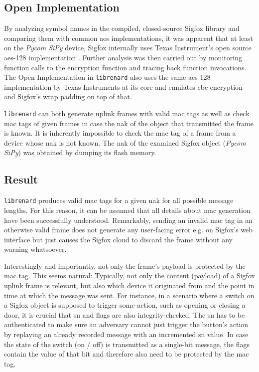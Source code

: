 \subsection{Open Implementation}
\label{sec:uplink_mac_reimp}
By analyzing symbol names in the compiled, closed-source Sigfox library and comparing them with common \gls{aes} implementations, it was apparent that at least on the \textit{Pycom SiPy} device, Sigfox internally uses Texas Instrument's open source \gls{aes}-128 implementation \cite{tiaes}.
Further analysis was then carried out by monitoring function calls to the encryption function and tracing back function invocations.
The Open Implementation in \texttt{librenard} also uses the same \gls{aes}-128 implementation by Texas Instruments at its core and emulates \gls{cbc} encryption and Sigfox's wrap padding on top of that.

\texttt{librenard} can both generate uplink frames with valid \gls{mac} tags as well as check \gls{mac} tags of given frames in case the \gls{nak} of the object that transmitted the frame is known.
It is inherently impossible to check the \gls{mac} tag of a frame from a device whose \gls{nak} is not known.
The \gls{nak} of the examined Sigfox object (\textit{Pycom SiPy}) was obtained by dumping its flash memory.

\subsection{Result}
\label{sec:uplink_mac_result}
\texttt{librenard} produces valid \gls{mac} tags for a given \gls{nak} for all possible message lengths.
For this reason, it can be assumed that all details about \gls{mac} generation have been successfully understood.
Remarkably, sending an invalid \gls{mac} tag in an otherwise valid frame does not generate any user-facing error e.g. on Sigfox's web interface but just causes the Sigfox cloud to discard the frame without any warning whatsoever.

Interestingly and importantly, not only the frame's payload is protected by the \gls{mac} tag.
This seems natural: Typically, not only the content (payload) of a Sigfox uplink frame is relevant, but also which device it originated from and the point in time at which the message was sent.
For instance, in a scenario where a switch on a Sigfox object is supposed to trigger some action, such as opening or closing a door, it is crucial that \gls{sn} and flags are also integrity-checked.
The \gls{sn} has to be authenticated to make sure an adversary cannot just trigger the button's action by replaying an already recorded message with an incremented \gls{sn} value.
In case the state of the switch (on / off) is transmitted as a single-bit message, the flags contain the value of that bit and therefore also need to be protected by the \gls{mac} tag.

